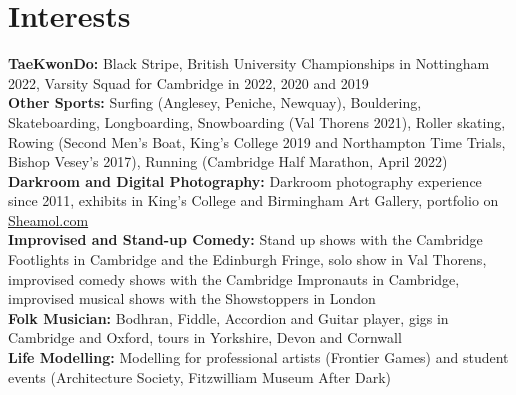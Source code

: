 \documentclass{article}
\begin{document}
\section*{Interests}
\textbf{TaeKwonDo:} Black Stripe, British University Championships in Nottingham 2022, Varsity Squad for Cambridge in 2022, 2020 and 2019\\
\textbf{Other Sports:} Surfing (Anglesey, Peniche, Newquay), Bouldering, Skateboarding, Longboarding, Snowboarding (Val Thorens 2021), Roller skating, Rowing (Second Men's Boat, King's College 2019 and Northampton Time Trials, Bishop Vesey's 2017), Running (Cambridge Half Marathon, April 2022)\\
\textbf{Darkroom and Digital Photography:} Darkroom photography experience since 2011,  exhibits in King's College and Birmingham Art Gallery, portfolio on \href{www.sheamol.com}{Sheamol.com}\\
\textbf{Improvised and Stand-up Comedy:} Stand up shows with the Cambridge Footlights in Cambridge and the Edinburgh Fringe, solo show in Val Thorens, improvised comedy shows with the Cambridge Impronauts in Cambridge, improvised musical shows with the Showstoppers in London \\
\textbf{Folk Musician:} Bodhran, Fiddle, Accordion and Guitar player, gigs in Cambridge and Oxford, tours in Yorkshire, Devon and Cornwall \\
\textbf{Life Modelling:} Modelling for professional artists (Frontier Games) and student events (Architecture Society, Fitzwilliam Museum After Dark) \medskip

\vspace{-.5\baselineskip}
\hrulefill
\vspace{-.5\baselineskip}
\end{document}
